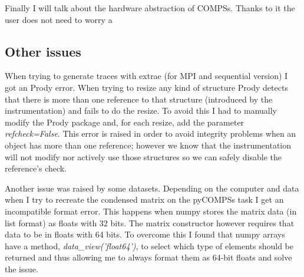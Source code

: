 Finally I will talk about the hardware abstraction of COMPSs. Thanks to it the user does not need to worry a

\subsection{Other issues}


When trying to generate traces with extrae (for MPI and sequential version) I got an Prody error. When trying to resize any kind of structure Prody detects that there is more than one reference to that structure (introduced by the instrumentation) and fails to do the resize. To avoid this I had to manually modify the Prody package and, for each resize, add the parameter \textit{refcheck=False}. This error is raised in order to avoid integrity problems when an object has more than one reference; however we know that the instrumentation will not modify nor actively use those structures so we can safely disable the reference's check. 

Another issue was raised by some datasets. Depending on the computer and data when I try to recreate the condensed matrix on the pyCOMPSs task I get an incompatible format error. This happens when numpy stores the matrix data (in list format) as floats with 32 bits. The matrix constructor however requires that data to be in floats with 64 bits. To overcome this I found that numpy arrays have a method, \textit{data\_view('float64')}, to select which type of elements should be returned and thus allowing me to always format them as 64-bit floats and solve the issue.








